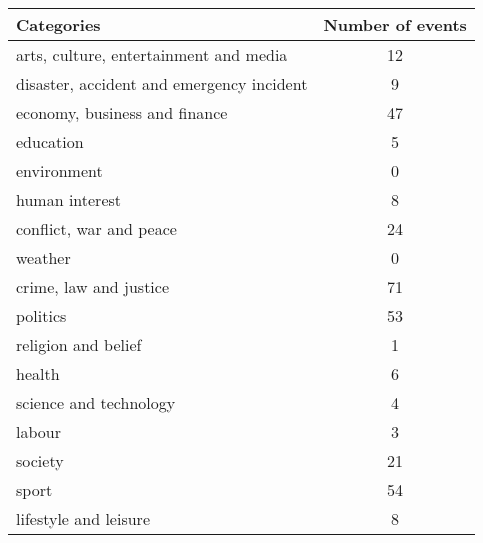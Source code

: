 \begin{tabular}{lc}
\toprule
                         Categories		  & Number of events  \\
\midrule
    arts, culture, entertainment and media &                12 \\
 disaster, accident and emergency incident &                 9 \\
             economy, business and finance &                47 \\
                                 education &                 5 \\
                               environment &                 0 \\
                            human interest &                 8 \\
                   conflict, war and peace &                24 \\
                                   weather &                 0 \\
                    crime, law and justice &                71 \\
                                  politics &                53 \\
                       religion and belief &                 1 \\
                                    health &                 6 \\
                    science and technology &                 4 \\
                                    labour &                 3 \\
                                   society &                21 \\
                                     sport &                54 \\
                     lifestyle and leisure &                 8 \\
\bottomrule
\end{tabular}
